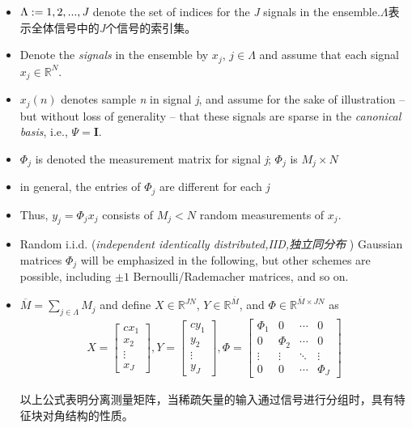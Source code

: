 \documentclass[UTF8]{ctexart}
\theoremstyle{plain}
\theoremstyle{definition}
\theoremstyle{remark}
\begin{document}
		
		\begin{itemize}
			\item \textcolor[rgb]{1,0,0}{$\Lambda := {1,2,...,\emph{J}}$ denote the set of indices for the \emph{J} signals in the ensemble.$\Lambda$表示全体信号中的\emph{J}个信号的索引集}。
			\item Denote the \emph{signals} in the ensemble by $x_j$, $j \in \Lambda$ and assume that each signal $x_j \in \mathbb{R}^N$.
			\item $x_j(n)$ denotes sample \emph{n} in signal \emph{j}, and assume for the sake of illustration -- but without loss of generality -- that these signals are sparse in the \emph{canonical basis}, i.e., $\Psi = \textbf{I}$.
			\item $\Phi_j$ is denoted the measurement matrix for signal \emph{j}; $\Phi_j$ is $M_j \times N$
			\item in general, the entries of $\Phi_j$ are different for each \emph{j}
			\item Thus, $y_j = \Phi_j x_j$ consists of $M_j<N$ random measurements of $x_j$.
			\item Random i.i.d. (\emph{\textcolor[rgb]{1,0,0}{independent identically distributed,IID,独立同分布}} ) Gaussian matrices $\Phi_j$ will be emphasized in the following, but other schemes are possible, including $\pm1$ Bernoulli/Rademacher matrices, and  so on.
			\item $\overline{M} = \sum_{j \in \Lambda}M_j$ and define $X \in \mathbb{R}^{JN}$, $Y \in \mathbb{R}^{\overline{M}}$, and $\Phi \in \mathbb{R}^{\overline{M} \times JN}$ as \\
			\begin{equation}
				\begin{smallmatrix}
					X= \left[
					\begin{matrix}{c}	
						x_1 \\
						x_2	\\
						\vdots\\
						x_J
					\end{matrix}
					\right] ,
					Y= \left[
					\begin{matrix}{c}
						y_1\\
						y_2\\
						\vdots\\
						y_J
					\end{matrix}
					\right],				
					\Phi=\left[
					\begin{array}{cccc}
						\Phi_1 & 0 & \cdots & 0\\
						0 & \Phi_2 & \cdots & 0\\
						\vdots & \vdots & \ddots & \vdots \\
						0 & 0 & \cdots & \Phi_J
					\end{array}
					\right]	
				\end{smallmatrix}
				\label{eq4}
			\end{equation}
			
			以上公式表明分离测量矩阵，当稀疏矢量的输入通过信号进行分组时，具有特征块对角结构的性质。
		\end{itemize}
		
\end{document}
